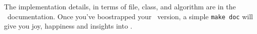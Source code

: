 The implementation details, in terms of file, class,
and algorithm are in the \Doxygen\ documentation.
Once you've boostrapped your \Antioch\ version, a
simple \verb!make doc! will give you joy, happiness
and insights into \Antioch.

